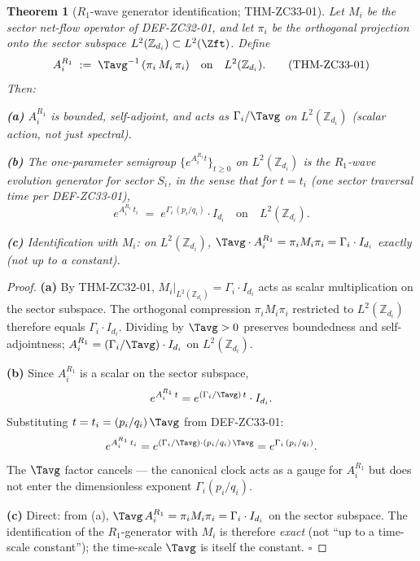 \documentclass[12pt, a4paper]{article}
\newtheorem{theorem}{Theorem}[section]
\begin{document}
\begin{theorem}[$R_1$-wave generator identification;
  THM-ZC33-01]
\label{thm:zc33-01}
Let $M_i$ be the sector net-flow operator of DEF-ZC32-01,
and let $\pi_i$ be the orthogonal projection onto the sector
subspace $L^2(\mathbb{Z}_{d_i})\subset L^2(\Zft)$. Define
\begin{equation}
  A_i^{R_1} \;:=\; \Tavg^{-1}\,(\pi_i\,M_i\,\pi_i)
  \quad\text{on}\quad
  L^2(\mathbb{Z}_{d_i}).
  \tag{THM-ZC33-01}\label{eq:thm-zc33-01}
\end{equation}
Then:

\textbf{(a)} $A_i^{R_1}$ is bounded, self-adjoint, and
acts as $\Gamma_i/\Tavg$ on $L^2(\mathbb{Z}_{d_i})$
(scalar action, not just spectral).

\textbf{(b)} The one-parameter semigroup
$\{e^{A_i^{R_1} t}\}_{t\geq 0}$ on $L^2(\mathbb{Z}_{d_i})$
is the $R_1$-wave evolution generator for sector $S_i$,
in the sense that for $t = t_i$ (one sector traversal
time per DEF-ZC33-01),
\[
  e^{A_i^{R_1}\,t_i} \;=\; e^{\Gamma_i\,(p_i/q_i)}\cdot I_{d_i}
  \quad\text{on}\quad L^2(\mathbb{Z}_{d_i}).
\]

\textbf{(c)} Identification with $M_i$: on $L^2(\mathbb{Z}_{d_i})$,
$\Tavg\cdot A_i^{R_1} = \pi_i M_i \pi_i = \Gamma_i\cdot I_{d_i}$
exactly (not up to a constant).
\end{theorem}

\begin{proof}
\textbf{(a)} By THM-ZC32-01, $M_i|_{L^2(\mathbb{Z}_{d_i})}
= \Gamma_i\cdot I_{d_i}$ acts as scalar multiplication on
the sector subspace. The orthogonal compression
$\pi_i M_i \pi_i$ restricted to $L^2(\mathbb{Z}_{d_i})$
therefore equals $\Gamma_i\cdot I_{d_i}$. Dividing by
$\Tavg > 0$ preserves boundedness and self-adjointness;
$A_i^{R_1} = (\Gamma_i/\Tavg)\cdot I_{d_i}$ on
$L^2(\mathbb{Z}_{d_i})$.

\textbf{(b)} Since $A_i^{R_1}$ is a scalar on the sector
subspace,
\[
  e^{A_i^{R_1}\,t} = e^{(\Gamma_i/\Tavg)\,t}\cdot I_{d_i}.
\]
Substituting $t = t_i = (p_i/q_i)\,\Tavg$ from DEF-ZC33-01:
\[
  e^{A_i^{R_1}\,t_i}
    = e^{(\Gamma_i/\Tavg)\cdot (p_i/q_i)\,\Tavg}
    = e^{\Gamma_i\,(p_i/q_i)}.
\]
The $\Tavg$ factor cancels --- the canonical clock acts as
a gauge for $A_i^{R_1}$ but does not enter the dimensionless
exponent $\Gamma_i (p_i/q_i)$.

\textbf{(c)} Direct: from (a), $\Tavg\,A_i^{R_1}
= \pi_i M_i \pi_i = \Gamma_i\cdot I_{d_i}$ on the sector
subspace. The identification of the $R_1$-generator with
$M_i$ is therefore \emph{exact} (not ``up to a time-scale
constant''); the time-scale $\Tavg$ is itself the constant.
\hfill$\square$
\end{proof}
\end{document}
